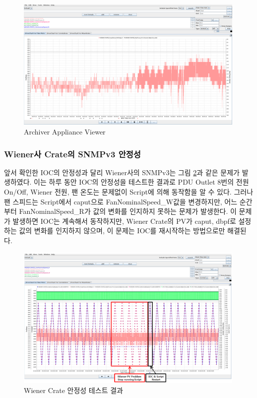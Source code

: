 \documentclass[11pt
  , a4paper
  , article
  , oneside
]{memoir}
\begin{document}
\begin{figure}[h!]
  \centering
  \includegraphics[width=0.99\textwidth]{./images/0507_archiver_wiener_temp_power.eps}
  \caption{Archiver Appliance Viewer}
  \label{fig:wienerv3}   
\end{figure}

\clearpage

\subsubsection{Wiener사 Crate의 SNMPv3 안정성}

앞서 확인한 IOC의 안정성과 달리 Wiener사의 SNMPv3는 그림 \ref{fig:issue}과 같은 문제가 발생하였다. 이는 하루 동안 IOC의 안정성을 테스트한 결과로 PDU Outlet 8번의 전원 On/Off, Wiener 전원, 팬 온도는 문제없이 Script에 의해 동작함을 알 수 있다. 그러나 팬 스피드는 Script에서 caput으로 FanNominalSpeed\_W값을 변경하지만, 어느 순간부터 FanNominalSpeed\_R가 값의 변화를 인지하지 못하는 문제가 발생한다. 이 문제가 발생하면 IOC는 계속해서 동작하지만, Wiener Crate의 PV가 caput, dbpf로 설정하는 값의 변화를 인지하지 않으며, 이 문제는 IOC를 재시작하는 방법으로만 해결된다.


\begin{figure}[h!]
  \centering
  \includegraphics[width=0.99\textwidth]{./images/issueioc.eps}
  \caption{Wiener Crate 안정성 테스트 결과}
  \label{fig:issue}   
\end{figure}
\end{document}
